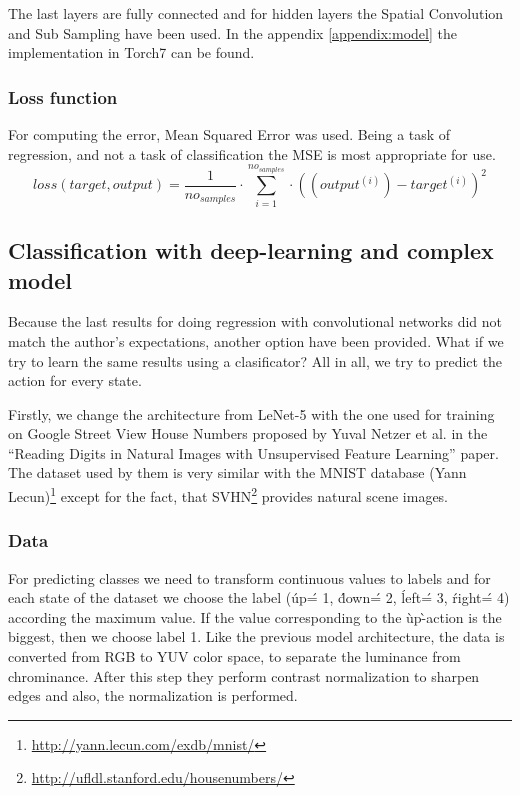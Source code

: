 The last layers are fully connected and for hidden layers the Spatial Convolution and Sub Sampling have been used. In the appendix \ref{appendix:model} the implementation in Torch7 can be found.

\subsubsection{Loss function}
For computing the error, Mean Squared Error was used. Being a task of regression, and not a task of classification the MSE is most appropriate for use.
\begin{equation}
loss(target,output) = \frac{1}{no_{samples}}\cdot\displaystyle\sum_{i=1}^{no_{samples}}\cdot((output^{(i)}) - target^{(i)})^2
\end{equation}


\subsection{Classification with deep-learning and complex model}

Because the last results for doing regression with convolutional networks did not match the author's expectations, another option have been provided. What if we try to learn the same results using a clasificator? All in all, we try to predict the action for every state.

Firstly, we change the architecture from LeNet-5 with the one used for training on Google Street View House Numbers proposed by Yuval Netzer et al. in the ``Reading Digits in Natural Images with Unsupervised Feature Learning''\cite{svhn} paper. The dataset used by them is very similar with the MNIST database (Yann Lecun)\footnote{\url{http://yann.lecun.com/exdb/mnist/}} except for the fact, that SVHN\footnote{\url{http://ufldl.stanford.edu/housenumbers/}} provides natural scene images.

\subsubsection{Data}
For predicting classes we need to transform continuous values to labels and for each state of the dataset we choose the label (\'up\' = 1, \'down\' = 2, \'left\' = 3, \'right\' = 4) according the maximum value. If the value corresponding to the \`up\`-action is the biggest, then we choose label 1.
Like the previous model architecture, the data is converted from RGB to YUV color space, to separate the luminance from chrominance. After this step they perform contrast normalization to sharpen edges and also, the normalization is performed.

